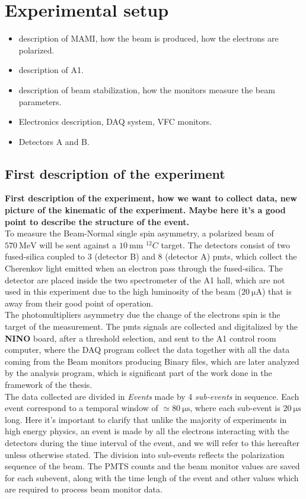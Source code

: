 \chapter{Experimental setup} 
\begin{itemize}
\item description of MAMI, how the beam is produced, how the electrons are polarized.
\item description of A1.
\item description of beam stabilization, how the monitors measure the beam parameters.
\item Electronics description, DAQ system, VFC monitors.
\item Detectors A and B.
\end{itemize}

\section{First description of the experiment}

{\bfseries First description of the experiment, how we want to collect data, new picture of the kinematic of the experiment. Maybe here it's a good point to describe the structure of the event.} \\
To measure the Beam-Normal single spin asymmetry, a polarized beam of $ \SI{570}{\mega \electronvolt}$ will be sent against a $\SI{10}{\milli \meter}$ $^{12}C$ target. The detectors consist of two fused-silica coupled to 3 (detector B) and 8 (detector A) pmts, which collect the Cherenkov light emitted when an electron pass through the fused-silica. The detector are placed inside the two spectrometer of the A1 hall, which are not used in this experiment due to the high luminosity of the beam ($ \SI{20}{\micro \ampere}$) that is away from their good point of operation. \\
The photomultipliers asymmetry due the change of the electrons spin is the target of the measurement. The pmts signals are collected and digitalized by the \textbf{NINO} board, after a threshold selection, and sent to the A1 control room computer, where the DAQ program collect the data together with all the data coming from the Beam monitors producing Binary files, which are later analyzed by the analysis program, which is significant part of the work done in the framework of the thesis. \\
The data collected are divided in \textit{Events} made by 4 \textit{sub-events} in sequence. Each event correspond to a temporal window of $\simeq \SI{80}{\micro \second}$, where each sub-event is $\SI{20}{\micro \second}$ long. Here it's important to clarify that unlike the majority of experiments in high energy physics, an event is made by all the electrons interacting with the detectors during the time interval of the event, and we will refer to this hereafter unless otherwise stated. The division into sub-events reflects the polarization sequence of the beam. The PMTS counts and the beam monitor values are saved for each subevent, along with the time lengh of the event and other values which are required to process beam monitor data.\\ 

